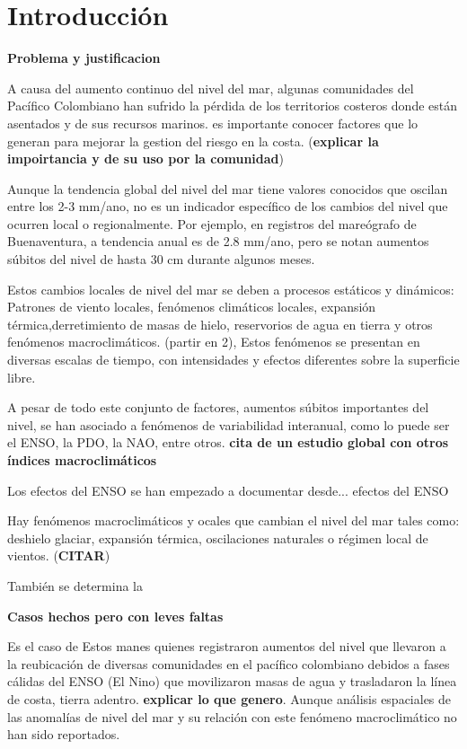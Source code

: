 \chapter{Introducci\'{o}n}

\textbf{Problema y justificacion}

A causa del aumento continuo del nivel del mar, algunas comunidades del Pac\'{i}fico Colombiano han sufrido la p\'{e}rdida de los territorios costeros donde est\'{a}n asentados y de sus recursos marinos. es importante conocer factores que lo generan para mejorar la gestion del riesgo en la costa. (\textbf{explicar la impoirtancia y de su uso por la comunidad})

Aunque la tendencia global del nivel del mar tiene valores conocidos que oscilan entre los 2-3 mm/ano, no es un indicador espec\'{i}fico de los cambios del nivel que ocurren local o regionalmente. Por ejemplo, en registros del mare\'{o}grafo de Buenaventura, a tendencia anual es de 2.8 mm/ano, pero se notan aumentos s\'{u}bitos del nivel de hasta 30 cm durante algunos meses.

Estos cambios locales de nivel del mar se deben a procesos est\'{a}ticos y din\'{a}micos: Patrones de viento locales, fen\'{o}menos clim\'{a}ticos locales, expansi\'{o}n t\'{e}rmica,derretimiento de masas de hielo, reservorios de agua en tierra y otros fen\'{o}menos macroclim\'{a}ticos. (partir en 2), Estos fen\'{o}menos se presentan en diversas escalas de tiempo, con intensidades y efectos diferentes sobre la superficie libre.

A pesar de todo este conjunto de factores, aumentos s\'{u}bitos importantes del nivel, se han  asociado a fen\'{o}menos de variabilidad interanual, como lo puede ser el ENSO, la PDO, la NAO, entre otros.  \textbf{cita de un estudio global con otros \'{i}ndices macroclim\'{a}ticos}

Los efectos del ENSO se han empezado a documentar desde... efectos del ENSO

Hay fenómenos macroclimáticos y ocales que cambian el nivel del mar tales como: deshielo glaciar, expansión térmica, oscilaciones naturales o régimen local de vientos. (\textbf{CITAR}) 




También se determina la 


\textbf{Casos hechos pero con leves faltas}

Es el caso de Estos manes quienes registraron aumentos del nivel que llevaron a la reubicaci\'{o}n de diversas comunidades en el pac\'{i}fico colombiano debidos a fases c\'{a}lidas del ENSO (El Nino) que movilizaron masas de agua y trasladaron la línea de costa, tierra adentro. \textbf{explicar lo que genero}. Aunque an\'{a}lisis espaciales de las anomal\'{i}as de nivel del mar y su relaci\'{o}n con este fen\'{o}meno macroclim\'{a}tico no han sido reportados.

